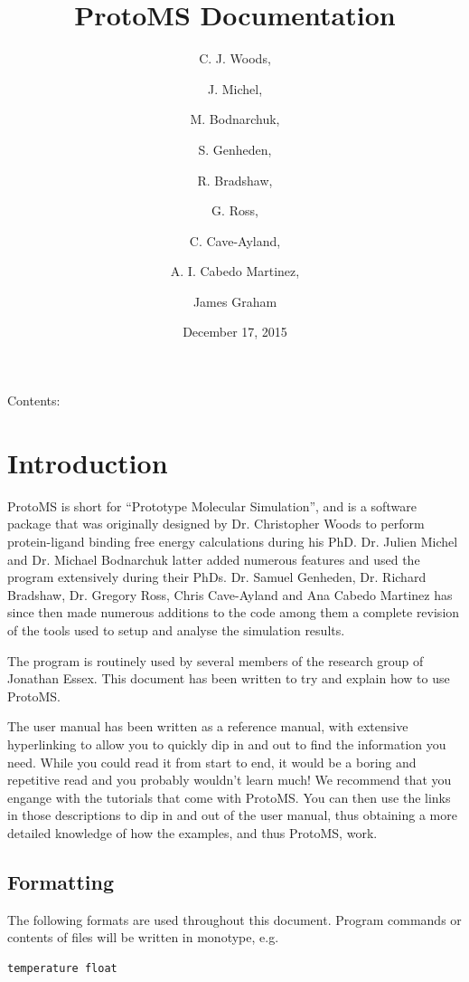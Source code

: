 \documentclass[letterpaper,10pt,english]{manual}
\title{ProtoMS Documentation}
\date{December 17, 2015}
\author{C. J. Woods, \and J. Michel, \and M. Bodnarchuk, \and S. Genheden, \and R. Bradshaw, \and G. Ross, \and C. Cave-Ayland, \and A. I. Cabedo Martinez, \and James Graham}
\begin{document}
\maketitle
\tableofcontents
\hypertarget{--doc-index}{}


Contents:

\resetcurrentobjects
\hypertarget{--doc-introduction}{}

\chapter{Introduction}

ProtoMS is short for “Prototype Molecular Simulation”, and is a software package that was originally designed by Dr. Christopher Woods to perform protein-ligand binding free energy calculations during his PhD. Dr. Julien Michel and Dr. Michael Bodnarchuk latter added numerous features and used the program extensively during their PhDs. Dr. Samuel Genheden, Dr. Richard Bradshaw, Dr. Gregory Ross, Chris Cave-Ayland and Ana Cabedo Martinez has since then made numerous additions to the code among them a complete revision of the tools used to setup and analyse the simulation results.

The program is routinely used by several members of the research group of Jonathan Essex. This document has been written to try and explain how to use ProtoMS.

The user manual has been written as a reference manual, with extensive hyperlinking to allow you to quickly dip in and out to find the information you need. While you could read it from start to end, it would be a boring and repetitive read and you probably wouldn’t learn much! We recommend that you engange with the tutorials that come with ProtoMS. You can then use the links in those descriptions to dip in and out of the user manual, thus obtaining a more detailed knowledge of how the examples, and thus ProtoMS, work.


\section{Formatting}

The following formats are used throughout this document. Program commands or contents of files will be written in monotype, e.g.

\begin{Verbatim}[commandchars=@\[\]]
temperature float
\end{Verbatim}
\end{document}
